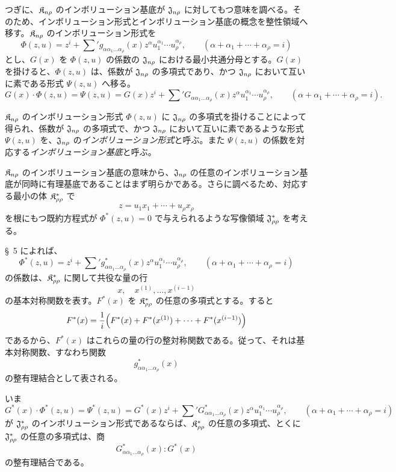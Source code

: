 \documentclass[11pt]{article}
\begin{document}
つぎに、$\mathfrak{K}_{n\rho}$ のインボリューション基底が $\mathfrak{J}_{n\rho}$ に対してもつ意味を調べる。そのため、インボリューション形式とインボリューション基底の概念を整性領域へ移す。$\mathfrak{K}_{n\rho}$ のインボリューション形式を
\[
  \Phi(z,u)=z^i+\sum{}' g_{\alpha\alpha_1\ldots\alpha_\rho}(x)
  z^\alpha u_1^{\alpha_1}\cdots u_\rho^{\alpha_\rho},
  \qquad
  (\alpha+\alpha_1+\cdots+\alpha_\rho=i)
\]
とし、$G(x)$ を $\Phi(z,u)$ の係数の $\mathfrak{J}_{n\rho}$ における最小共通分母とする。$G(x)$ を掛けると、$\Phi(z,u)$ は、係数が $\mathfrak{J}_{n\rho}$ の多項式であり、かつ $\mathfrak{J}_{n\rho}$ において互いに素である形式 $\Psi(z,u)$ へ移る。
\[
  G(x)\cdot\Phi(z,u)=\Psi(z,u)
  =G(x)z^i+
  \sum{}' G_{\alpha\alpha_1\ldots\alpha_\rho}(x)
  z^\alpha u_1^{\alpha_1}\cdots u_\rho^{\alpha_\rho},
  \qquad
  (\alpha+\alpha_1+\cdots+\alpha_\rho=i).
\]

$\mathfrak{K}_{n\rho}$ のインボリューション形式 $\Phi(z,u)$ に $\mathfrak{J}_{n\rho}$ の多項式を掛けることによって得られ、係数が $\mathfrak{J}_{n\rho}$ の多項式で、かつ $\mathfrak{J}_{n\rho}$ において互いに素であるような形式 $\Psi(z,u)$ を、$\mathfrak{J}_{n\rho}$ の\emph{インボリューション形式}と呼ぶ。また $\Psi(z,u)$ の係数を対応する\emph{インボリューション基底}と呼ぶ。

$\mathfrak{K}_{n\rho}$ のインボリューション基底の意味から、$\mathfrak{J}_{n\rho}$ の任意のインボリューション基底が同時に有理基底であることはまず明らかである。さらに調べるため、対応する最小の体 $\mathfrak{K}^*_{\rho\rho}$ で
\[
  z=u_1x_1+\cdots+u_\rho x_\rho
\]
を根にもつ既約方程式が $\Phi^*(z,u)=0$ で与えられるような写像領域 $\mathfrak{J}^*_{\rho\rho}$ を考える。

\S\ 5 によれば、
\[
  \Phi^*(z,u)=z^i+\sum{}' g^*_{\alpha\alpha_1\ldots\alpha_\rho}(x)
  z^\alpha u_1^{\alpha_1}\cdots u_\rho^{\alpha_\rho},
  \qquad
  (\alpha+\alpha_1+\cdots+\alpha_\rho=i)
\]
の係数は、$\mathfrak{K}^*_{\rho\rho}$ に関して共役な量の行
\[
  x,\quad x^{(1)},\ldots,x^{(i-1)}
\]
の基本対称関数を表す。$F^*(x)$ を $\mathfrak{K}^*_{\rho\rho}$ の任意の多項式とする。すると
\[
  F^*(x)=\frac1i\Bigl(F^*(x)+F^*(x^{(1)})+
  \cdots+F^*(x^{(i-1)})\Bigr)
\]
であるから、$F^*(x)$ はこれらの量の行の整対称関数である。従って、それは基本対称関数、すなわち関数
\[
  g^*_{\alpha\alpha_1\ldots\alpha_\rho}(x)
\]
の整有理結合として表される。

いま
\[
  G^*(x)\cdot\Phi^*(z,u)=\Psi^*(z,u)
  =G^*(x)z^i+
  \sum{}'G^*_{\alpha\alpha_1\ldots\alpha_\rho}(x)
  z^\alpha u_1^{\alpha_1}\cdots u_\rho^{\alpha_\rho},
  \qquad
  (\alpha+\alpha_1+\cdots+\alpha_\rho=i)
\]
が $\mathfrak{J}^*_{\rho\rho}$ のインボリューション形式であるならば、$\mathfrak{K}^*_{\rho\rho}$ の任意の多項式、とくに $\mathfrak{J}^*_{\rho\rho}$ の任意の多項式は、商
\[
  G^*_{\alpha\alpha_1\ldots\alpha_\rho}(x):G^*(x)
\]
の整有理結合である。
\end{document}
